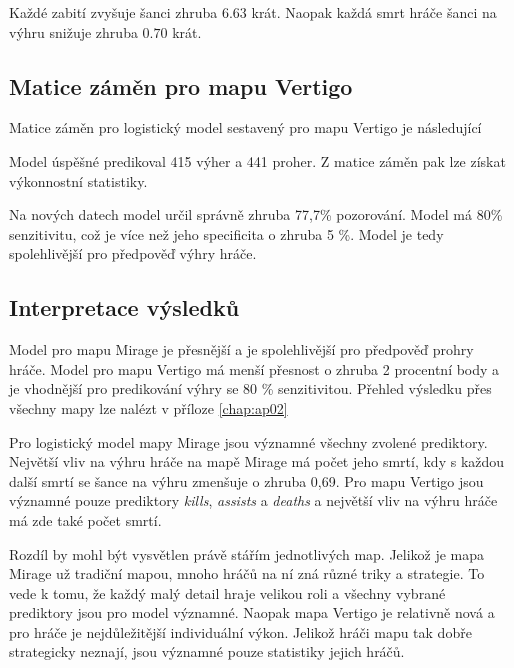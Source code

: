 {\color{red}
Každé zabití zvyšuje šanci zhruba $6.63$ krát. Naopak každá smrt hráče šanci na výhru snižuje zhruba $0.70$ krát.
}

\newpage
\subsection{Matice záměn pro mapu Vertigo}
Matice záměn pro logistický model sestavený pro mapu Vertigo je následující



Model úspěšné predikoval 415 výher a 441 proher. Z matice záměn pak lze získat výkonnostní statistiky.



Na nových datech model určil správně zhruba 77,7\% pozorování. Model má 80\% senzitivitu, což je více než jeho specificita o zhruba 5 \%. Model je tedy spolehlivější
pro předpověď výhry hráče.

\subsection{Interpretace výsledků}
Model pro mapu Mirage je přesnější a je spolehlivější pro předpověď prohry hráče. Model pro mapu Vertigo má menší přesnost o zhruba 
2 procentní body a je vhodnější pro predikování výhry se 80 \% senzitivitou.
{\color{red}
Přehled výsledku přes všechny mapy lze nalézt v příloze \ref{chap:ap02}
}

Pro logistický model mapy Mirage jsou významné všechny zvolené prediktory. Největší vliv na výhru hráče na mapě Mirage má počet jeho smrtí, kdy s každou další smrtí se šance
na výhru zmenšuje o zhruba 0,69. Pro mapu Vertigo jsou významné pouze prediktory \textit{kills}, \textit{assists} a \textit{deaths} a největší vliv na výhru hráče
má zde také počet smrtí.

Rozdíl by mohl být vysvětlen právě stářím jednotlivých map. Jelikož je mapa Mirage už tradiční mapou, mnoho hráčů na ní zná různé triky a strategie. To vede k tomu, že
každý malý detail hraje velikou roli a všechny vybrané prediktory jsou pro model významné. Naopak mapa Vertigo je relativně nová a pro hráče je nejdůležitější individuální
výkon. Jelikož hráči mapu tak dobře strategicky neznají, jsou významné pouze statistiky jejich hráčů.